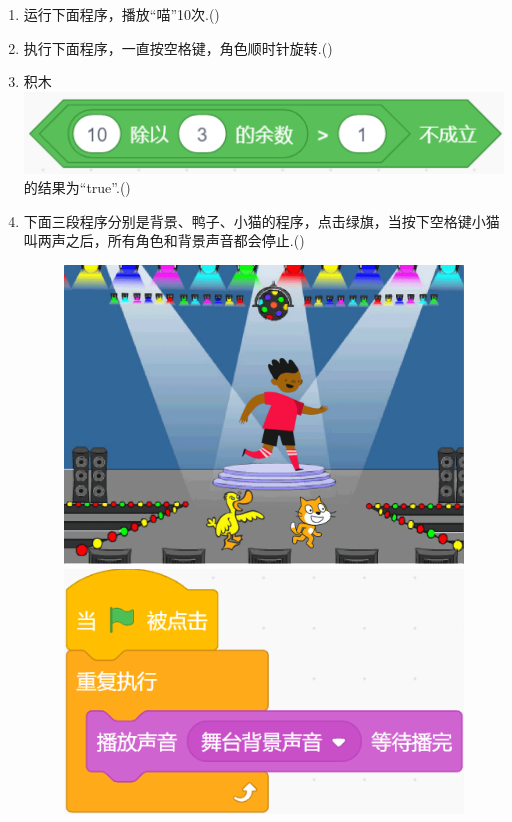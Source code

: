 \documentclass[10pt, a4paper]{article}
\begin{document}
\begin{enumerate}
        \item 运行下面程序，播放“喵”10次.(\qquad)
        
        \item 执行下面程序，一直按空格键，角色顺时针旋转.(\qquad)
        
        \item 积木\includegraphics[width=.25\textwidth]{34.png}的结果为“true”.(\qquad)
        
        \newpage
        \item 下面三段程序分别是背景、鸭子、小猫的程序，点击绿旗，当按下空格键小猫叫两声之后，所有角色和背景声音都会停止.(\qquad)
        \begin{figure}[htbp]
            \centering
            \begin{minipage}[t]{.2\textwidth}
                \centering
                \includegraphics[width=\textwidth]{35-1.png}
            \end{minipage}
            \begin{minipage}[t]{.25\textwidth}
                \centering
                \includegraphics[width=1\textwidth]{35-2.png}

\end{minipage}
\end{figure}
\end{enumerate}
\end{document}
